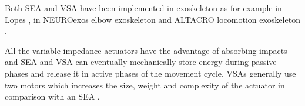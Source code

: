 Both SEA and VSA have been implemented in exoskeleton as for example in Lopes \cite{veneman2007design},  in NEUROexos elbow exoskeleton \cite{vitiello2013neuroexos}and  ALTACRO locomotion exoskeleton \cite{cherelle2010maccepa}.

All the variable impedance actuators have the advantage of absorbing impacts and SEA and VSA %
can eventually mechanically store energy during passive phases and release it in active phases of the movement cycle.  VSAs generally use two motors which increases the size, weight and complexity of the actuator in comparison with an SEA \cite{wolf2011dlr}.

